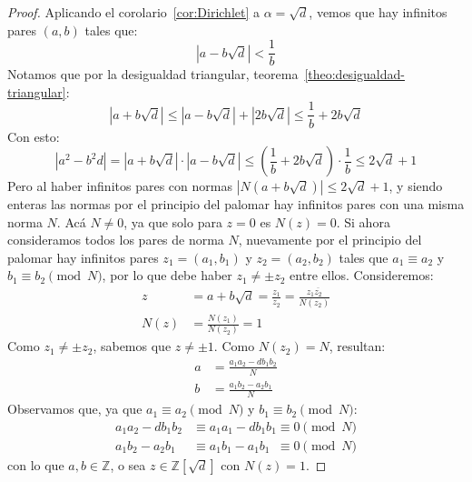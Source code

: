   \begin{proof}
    Aplicando el corolario~\ref{cor:Dirichlet} a \(\alpha = \sqrt{d}\),
    vemos que hay infinitos pares \((a, b)\) tales que:
    \begin{equation*}
      \left\lvert a - b \sqrt{d} \right\rvert
	< \frac{1}{b}
    \end{equation*}
    Notamos que por la desigualdad triangular,%
    teorema~\ref{theo:desigualdad-triangular}:
    \begin{equation*}
      \left\lvert a + b \sqrt{d} \right\rvert
	\le \left\lvert a - b \sqrt{d} \right\rvert
	      + \left\lvert 2 b \sqrt{d} \right\rvert
	\le \frac{1}{b} + 2 b \sqrt{d}
    \end{equation*}
    Con esto:
    \begin{equation*}
      \left\lvert a^2 - b^2 d \right\rvert
	= \left\lvert a + b \sqrt{d} \right\rvert
	    \cdot \left\lvert a - b \sqrt{d} \right\rvert
	\le \left( \frac{1}{b} + 2 b \sqrt{d} \right) \cdot \frac{1}{b}
	\le 2 \sqrt{d} + 1
    \end{equation*}
    Pero al haber infinitos pares
    con normas
      \(\left\lvert N(a + b \sqrt{d}) \right\rvert \le 2 \sqrt{d} + 1\),
    y siendo enteras las normas
    por el principio del palomar%
    hay infinitos pares
    con una misma norma \(N\).
    Acá \(N \ne 0\),
    ya que solo para \(z = 0\) es \(N(z) = 0\).
    Si ahora consideramos todos los pares de norma \(N\),
    nuevamente por el principio del palomar hay infinitos pares
    \(z_1 = (a_1, b_1)\) y \(z_2 = (a_2, b_2)\)
    tales que \(a_1 \equiv a_2\) y \(b_1 \equiv b_2 \pmod{N}\),
    por lo que debe haber \(z_1 \ne \pm z_2\) entre ellos.
    Consideremos:
    \begin{align*}
      z
	&= a + b \sqrt{d}
	 = \frac{z_1}{z_2}
	 = \frac{z_1 \overline{z_2}}{N(z_2)} \\
      N(z)
	&=\frac{N(z_1)}{N(z_2)}
	 = 1
    \end{align*}
    Como \(z_1 \ne \pm z_2\),
    sabemos que \(z \ne \pm 1\).
    Como \(N(z_2) = N\),
    resultan:
    \begin{align*}
      a
	&= \frac{a_1 a_2 - d b_1 b_2}{N} \\
      b
	&= \frac{a_1 b_2 - a_2 b_1}{N}
    \end{align*}
    Observamos que,
    ya que \(a_1 \equiv a_2 \pmod{N}\) y \(b_1 \equiv b_2 \pmod{N}\):
    \begin{align*}
      a_1 a_2 - d b_1 b_2
	&\equiv a_1 a_1 - d b_1 b_1
	 \equiv 0 \pmod{N} \\
      a_1 b_2 - a_2 b_1
	&\equiv a_1 b_1 - a_1 b_1 \phantom{d}
	 \equiv 0 \pmod{N}
    \end{align*}
    con lo que \(a, b \in \mathbb{Z}\),
    o sea \(z \in \mathbb{Z}[\sqrt{d}]\) con \(N(z) = 1\).
  \end{proof}
